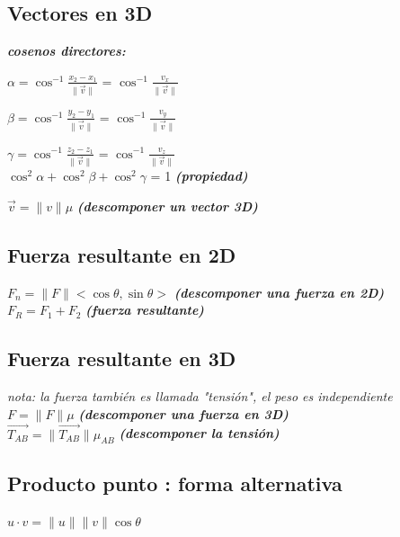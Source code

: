 \documentclass[letterpaper,12pt]{article}
\begin{document}
\begin{sloppypar}
\subsection*{\textbf{Vectores en 3D}}
\textcolor[rgb]{0.2,0.5,0.7}{\textbf{\textit{cosenos directores:}}}

$\displaystyle \alpha = \cos^{-1} \frac{x_2-x_1}{\| \vec{v} \| }$ = $\displaystyle \cos^{-1} \frac{v_x}{\| \vec{v} \| }$
    
$\displaystyle \beta = \cos^{-1} \frac{y_2-y_1}{\| \vec{v} \| }$ = $\displaystyle \cos^{-1} \frac{v_y}{\| \vec{v} \| }$
    
$\displaystyle \gamma = \cos^{-1} \frac{z_2-z_1}{\| \vec{v} \| }$ = $\displaystyle \cos^{-1} \frac{v_z}{\| \vec{v} \| }$
\vspace{0.3cm}\\  
$\cos ^{2} \alpha + \cos ^{2} \beta + \cos ^{2} \gamma$ = 1 \textcolor[rgb]{0.2,0.5,0.7}{\textbf{\textit{(propiedad)}}}

$\vec{v} = \|v\|\mu$ \textcolor[rgb]{0.2,0.5,0.7}{\textbf{\textit{(descomponer un vector 3D)}}}

\subsection*{\textbf{Fuerza resultante en 2D}}
$F_n = \|F\|<\cos \theta,\sin \theta>$ \textcolor[rgb]{0.2,0.5,0.7}{\textbf{\textit{(descomponer una fuerza en 2D)}}}
\vspace{0.3cm}\\
$F_R = F_1 + F_2$ \textcolor[rgb]{0.2,0.5,0.7}{\textbf{\textit{(fuerza resultante)}}}

\subsection*{\textbf{Fuerza resultante en 3D}}
\textit{nota: la fuerza también es llamada "tensión", el peso es independiente}
\vspace{0.3cm}\\
$F = \|F\|\mu$ \textcolor[rgb]{0.2,0.5,0.7}{\textbf{\textit{(descomponer una fuerza en 3D)}}}
\vspace{0.3cm}\\
$\vec{T_{AB}} = \| \vec{T_{AB}}\| \mu_{AB}$ \textcolor[rgb]{0.2,0.5,0.7}{\textbf{\textit{(descomponer la tensión)}}}

\subsection*{\textbf{Producto punto : forma alternativa}} 
$u \cdot v = \|u\| \|v\| \cos \theta$ 


\end{sloppypar}
\end{document}
